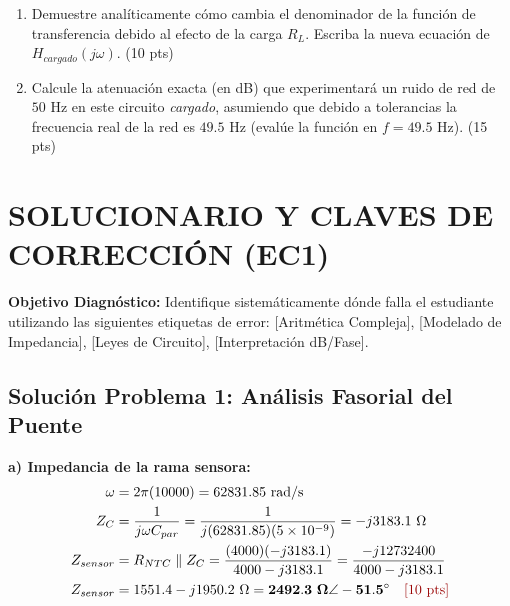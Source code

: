 \documentclass[11pt,a4paper,twoside]{article}
\begin{document}
\begin{enumerate}[label=\alph*)]
    \item Demuestre analíticamente cómo cambia el denominador de la función de transferencia debido al efecto de la carga $R_L$. Escriba la nueva ecuación de $H_{cargado}(j\omega)$. (10 pts)
    \item Calcule la atenuación exacta (en dB) que experimentará un ruido de red de $50\text{ Hz}$ en este circuito \textit{cargado}, asumiendo que debido a tolerancias la frecuencia real de la red es $49.5\text{ Hz}$ (evalúe la función en $f = 49.5\text{ Hz}$). (15 pts)
\end{enumerate}

\newpage
\section{SOLUCIONARIO Y CLAVES DE CORRECCIÓN (EC1)}

\begin{docente}
\textbf{Objetivo Diagnóstico:} Identifique sistemáticamente dónde falla el estudiante utilizando las siguientes etiquetas de error: [Aritmética Compleja], [Modelado de Impedancia], [Leyes de Circuito], [Interpretación dB/Fase].
\end{docente}

\subsection*{Solución Problema 1: Análisis Fasorial del Puente}
\textbf{a) Impedancia de la rama sensora:}
\begin{align*}
    \omega &= 2\pi(10000) = 62831.85\text{ rad/s} \\
    Z_C &= \frac{1}{j\omega C_{par}} = \frac{1}{j(62831.85)(5 \times 10^{-9})} = -j3183.1\ \Omega \\
    Z_{sensor} &= R_{NTC} \parallel Z_C = \frac{(4000)(-j3183.1)}{4000 - j3183.1} = \frac{-j12732400}{4000 - j3183.1} \\
    Z_{sensor} &= 1551.4 - j1950.2\ \Omega = \mathbf{2492.3\ \Omega \angle -51.5^\circ} \quad \text{\color{ucbred}[10 pts]}
\end{align*}
\end{document}
